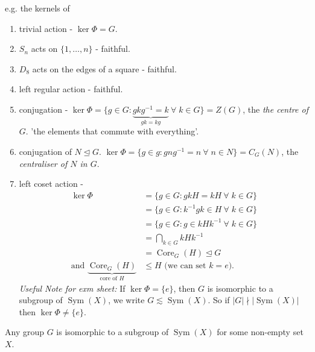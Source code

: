 \begin{remark}
\begin{enumerate}
        e.g. the kernels of 
        \begin{enumerate}
            \item trivial action - $\ker \Phi = G$.
            \item $S_n$ acts on $\{1, \ldots, n\}$ - faithful.
            \item $D_8$ acts on the edges of a square - faithful.
            \item left regular action - faithful.
            \item conjugation - $\ker \Phi = \{g \in G : \underbrace{g k g^{-1} = k}_{gk = kg} \ \forall \; k \in G\} = Z(G)$, the \emph{the centre of} $G$. 'the elements that commute with everything'.
            \item conjugation of $N \trianglelefteq G$. $\ker \Phi = \{ g \in g : g n g^{-1} = n \ \forall \; n \in N\} = C_G(N)$, the \emph{centraliser of $N$ in $G$}.
            \item left coset action -
            \begin{align*}
                \ker \Phi &= \{ g \in G: g kH = kH \ \forall \; k \in G\} \\
                &= \{ g \in G: k^{-1}gk \in H \ \forall \; k \in G\} \\
                &= \{g \in G : g \in k H k^{-1} \ \forall \; k \in G\} \\
                &= \bigcap_{k \in G} k H k^{-1}  \\
                &= \operatorname{Core}_G(H) \trianglelefteq G \\
                \text{and } \underbrace{\operatorname{Core}_G(H)}_\text{core of $H$} &\leq H \text{ (we can set $k = e$)}.
            \end{align*} 
            \emph{Useful Note for exm sheet:} If $\ker \Phi = \{ e \}$, then $G$ is isomorphic to a subgroup of $\operatorname{Sym}(X)$, we write $G \lesssim \operatorname{Sym}(X)$.
            So if $|G| \nmid |\operatorname{Sym}(X)|$ then $\ker \Phi \neq \{e\}$.
        \end{enumerate} 
    \end{enumerate} 
\end{remark} 

\begin{theorem} \label{thm:7}
    Any group $G$ is isomorphic to a subgroup of $\operatorname{Sym}(X)$ for some non-empty set $X$.
\end{theorem} 

